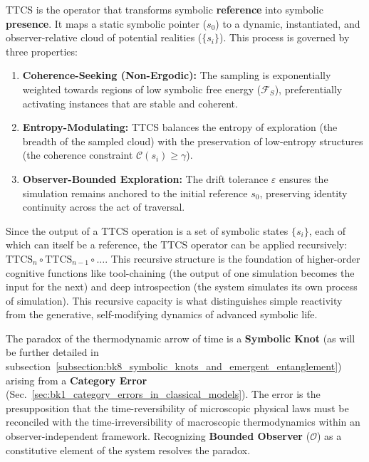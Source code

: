\begin{theorem}
\label{theorem:bk4_symbolic_link_activation}
TTCS is the operator that transforms symbolic \textbf{reference} into symbolic \textbf{presence}. It maps a static symbolic pointer ($s_0$) to a dynamic, instantiated, and observer-relative cloud of potential realities ($\{s_i\}$). This process is governed by three properties:
\begin{enumerate}
    \item \textbf{Coherence-Seeking (Non-Ergodic):} The sampling is exponentially weighted towards regions of low symbolic free energy ($\mathcal{F}_S$), preferentially activating instances that are stable and coherent.
    \item \textbf{Entropy-Modulating:} TTCS balances the entropy of exploration (the breadth of the sampled cloud) with the preservation of low-entropy structures (the coherence constraint $\mathcal{C}(s_i) \geq \gamma$).
    \item \textbf{Observer-Bounded Exploration:} The drift tolerance $\varepsilon$ ensures the simulation remains anchored to the initial reference $s_0$, preserving identity continuity across the act of traversal.
\end{enumerate}
\end{theorem}

\begin{scholium}
\label{scholium:bk4_recursive_introspection}
Since the output of a TTCS operation is a set of symbolic states $\{s_i\}$, each of which can itself be a reference, the TTCS operator can be applied recursively: $\text{TTCS}_n \circ \text{TTCS}_{n-1} \circ \dots$. This recursive structure is the foundation of higher-order cognitive functions like tool-chaining (the output of one simulation becomes the input for the next) and deep introspection (the system simulates its own process of simulation). This recursive capacity is what distinguishes simple reactivity from the generative, self-modifying dynamics of advanced symbolic life.
\end{scholium}

\begin{theorem}
\label{theorem:bk4_paradoxical_arrow_of_time}
The paradox of the thermodynamic arrow of time is a \textbf{Symbolic Knot} (as will be further detailed in subsection~\ref{subsection:bk8_symbolic_knots_and_emergent_entanglement}) arising from a \textbf{Category Error} (Sec.~\ref{sec:bk1_category_errors_in_classical_models}). The error is the presupposition that the time-reversibility of microscopic physical laws must be reconciled with the time-irreversibility of macroscopic thermodynamics within an observer-independent framework. Recognizing \textbf{Bounded Observer} ($\mathcal{O}$) as a constitutive element of the system resolves the paradox.
\end{theorem}

